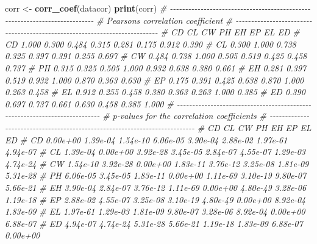 \documentclass[
]{book}
\makeatletter
\newenvironment{Shaded}{\begin{snugshade}}{\end{snugshade}}
\newcommand{\CommentTok}[1]{\textcolor[rgb]{0.56,0.35,0.01}{\textit{#1}}}
\newcommand{\KeywordTok}[1]{\textcolor[rgb]{0.13,0.29,0.53}{\textbf{#1}}}
\newcommand{\NormalTok}[1]{#1}
\newcommand{\StringTok}[1]{\textcolor[rgb]{0.31,0.60,0.02}{#1}}
\numberwithin{equation}{section}
\newcommand{\indf}[1]{\index[function]{#1@\texttt{#1()}|ST}}
\makeatother
\begin{document}
\indf{corr\_coef}

\begin{Shaded}
\begin{Highlighting}[]
\NormalTok{corr \textless{}{-}}\StringTok{ }\KeywordTok{corr\_coef}\NormalTok{(datacor)}
\KeywordTok{print}\NormalTok{(corr)}
\CommentTok{\# {-}{-}{-}{-}{-}{-}{-}{-}{-}{-}{-}{-}{-}{-}{-}{-}{-}{-}{-}{-}{-}{-}{-}{-}{-}{-}{-}{-}{-}{-}{-}{-}{-}{-}{-}{-}{-}{-}{-}{-}{-}{-}{-}{-}{-}{-}{-}{-}{-}{-}{-}{-}{-}{-}{-}{-}{-}{-}{-}{-}{-}{-}{-}{-}{-}{-}{-}{-}{-}{-}{-}{-}{-}{-}{-}}
\CommentTok{\# Pearson\textquotesingle{}s correlation coefficient}
\CommentTok{\# {-}{-}{-}{-}{-}{-}{-}{-}{-}{-}{-}{-}{-}{-}{-}{-}{-}{-}{-}{-}{-}{-}{-}{-}{-}{-}{-}{-}{-}{-}{-}{-}{-}{-}{-}{-}{-}{-}{-}{-}{-}{-}{-}{-}{-}{-}{-}{-}{-}{-}{-}{-}{-}{-}{-}{-}{-}{-}{-}{-}{-}{-}{-}{-}{-}{-}{-}{-}{-}{-}{-}{-}{-}{-}{-}}
\CommentTok{\#       CD    CL    CW    PH    EH    EP    EL    ED}
\CommentTok{\# CD 1.000 0.300 0.484 0.315 0.281 0.175 0.912 0.390}
\CommentTok{\# CL 0.300 1.000 0.738 0.325 0.397 0.391 0.255 0.697}
\CommentTok{\# CW 0.484 0.738 1.000 0.505 0.519 0.425 0.458 0.737}
\CommentTok{\# PH 0.315 0.325 0.505 1.000 0.932 0.638 0.380 0.661}
\CommentTok{\# EH 0.281 0.397 0.519 0.932 1.000 0.870 0.363 0.630}
\CommentTok{\# EP 0.175 0.391 0.425 0.638 0.870 1.000 0.263 0.458}
\CommentTok{\# EL 0.912 0.255 0.458 0.380 0.363 0.263 1.000 0.385}
\CommentTok{\# ED 0.390 0.697 0.737 0.661 0.630 0.458 0.385 1.000}
\CommentTok{\# {-}{-}{-}{-}{-}{-}{-}{-}{-}{-}{-}{-}{-}{-}{-}{-}{-}{-}{-}{-}{-}{-}{-}{-}{-}{-}{-}{-}{-}{-}{-}{-}{-}{-}{-}{-}{-}{-}{-}{-}{-}{-}{-}{-}{-}{-}{-}{-}{-}{-}{-}{-}{-}{-}{-}{-}{-}{-}{-}{-}{-}{-}{-}{-}{-}{-}{-}{-}{-}{-}{-}{-}{-}{-}{-}}
\CommentTok{\# p{-}values for the correlation coefficients}
\CommentTok{\# {-}{-}{-}{-}{-}{-}{-}{-}{-}{-}{-}{-}{-}{-}{-}{-}{-}{-}{-}{-}{-}{-}{-}{-}{-}{-}{-}{-}{-}{-}{-}{-}{-}{-}{-}{-}{-}{-}{-}{-}{-}{-}{-}{-}{-}{-}{-}{-}{-}{-}{-}{-}{-}{-}{-}{-}{-}{-}{-}{-}{-}{-}{-}{-}{-}{-}{-}{-}{-}{-}{-}{-}{-}{-}{-}}
\CommentTok{\#          CD       CL       CW       PH       EH       EP       EL       ED}
\CommentTok{\# CD 0.00e+00 1.39e{-}04 1.54e{-}10 6.06e{-}05 3.90e{-}04 2.88e{-}02 1.97e{-}61 4.94e{-}07}
\CommentTok{\# CL 1.39e{-}04 0.00e+00 3.92e{-}28 3.45e{-}05 2.84e{-}07 4.55e{-}07 1.29e{-}03 4.74e{-}24}
\CommentTok{\# CW 1.54e{-}10 3.92e{-}28 0.00e+00 1.83e{-}11 3.76e{-}12 3.25e{-}08 1.81e{-}09 5.31e{-}28}
\CommentTok{\# PH 6.06e{-}05 3.45e{-}05 1.83e{-}11 0.00e+00 1.11e{-}69 3.10e{-}19 9.80e{-}07 5.66e{-}21}
\CommentTok{\# EH 3.90e{-}04 2.84e{-}07 3.76e{-}12 1.11e{-}69 0.00e+00 4.80e{-}49 3.28e{-}06 1.19e{-}18}
\CommentTok{\# EP 2.88e{-}02 4.55e{-}07 3.25e{-}08 3.10e{-}19 4.80e{-}49 0.00e+00 8.92e{-}04 1.83e{-}09}
\CommentTok{\# EL 1.97e{-}61 1.29e{-}03 1.81e{-}09 9.80e{-}07 3.28e{-}06 8.92e{-}04 0.00e+00 6.88e{-}07}
\CommentTok{\# ED 4.94e{-}07 4.74e{-}24 5.31e{-}28 5.66e{-}21 1.19e{-}18 1.83e{-}09 6.88e{-}07 0.00e+00}
\end{Highlighting}
\end{Shaded}
\end{document}
